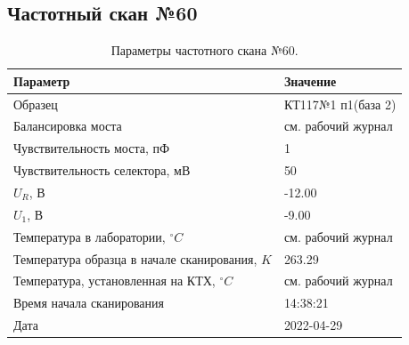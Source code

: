 \subsection{Частотный скан №60}
\begin{table}[!ht]
    \centering
    \caption{Параметры частотного скана №60.}
    \begin{tabular}{|l|l|}
        \hline
        Параметр                                       & Значение                  \\ \hline
        Образец                                        & КТ117№1 п1(база 2)        \\ \hline
        Балансировка моста                             & см. рабочий журнал        \\ \hline
        Чувствительность моста, пФ                     & 1                         \\ \hline
        Чувствительность селектора, мВ                 & 50                        \\ \hline
        $U_R$, В                                       & -12.00                    \\ \hline
        $U_1$, В                                       & -9.00                     \\ \hline
        Температура в лаборатории, $^\circ C$          & см. рабочий журнал        \\ \hline
        Температура образца в начале сканирования, $K$ & 263.29                    \\ \hline
        Температура, установленная на КТХ, $^\circ C$  & см. рабочий журнал        \\ \hline
        Время начала сканирования                      & 14:38:21                  \\ \hline
        Дата                                           & 2022-04-29                \\ \hline
    \end{tabular}
    \label{table:frequency_scan_60}
\end{table}

